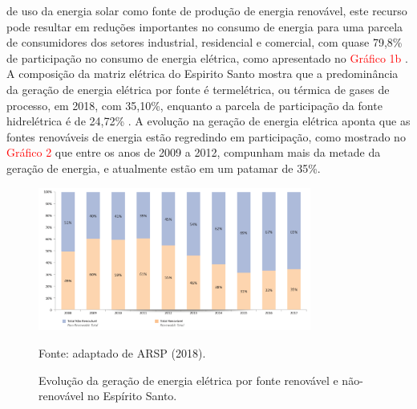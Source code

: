 \begin{onehalfspace}
    de uso da energia solar como fonte de produção de energia renovável, este recurso pode resultar 
    em reduções importantes no consumo de energia para uma parcela de consumidores dos setores 
    industrial, residencial e comercial, com quase 79,8\% de participação no consumo de energia 
    elétrica, como apresentado no \textcolor{red}{Gráfico 1b} \cite{Cronemberger2012,EmpresadePesquisaEnergetica-EPE2019,Sorgato2018,Sudhakar2019}.\vspace{0.3cm} \newline
    A composição da matriz elétrica do Espirito Santo mostra que a predominância da geração de 
    energia elétrica por fonte é termelétrica, ou térmica de gases de processo, em 2018, com 35,10\%, 
    enquanto a parcela de participação da fonte hidrelétrica é de 24,72\% \cite{AgenciadeRegulacaodeServicosPublicosdoEspiritoSanto-ARSP2018}.\vspace{0.3cm} \newline
    A evolução na geração de energia elétrica aponta que as fontes renováveis de energia estão 
    regredindo em participação, como mostrado no \textcolor{red}{Gráfico 2} que entre os anos de 
    2009 a 2012, compunham mais da metade da geração de energia, e atualmente estão em um 
    patamar de 35\%.\vspace*{-0.4cm}
    \begin{figure}[ht]
        \centering
        \caption{\small Evolução da geração de energia elétrica por fonte renovável e não-renovável no Espírito Santo.}
        \includegraphics[width=0.8\textwidth]{graphs/graph2_geracao_de_energia_eletrica_no_es-arsp_2018.png}
        \par \small Fonte: adaptado de ARSP (2018).
        \label{fig:Grafico 2}
    \end{figure}\pagebreak


\end{onehalfspace}
